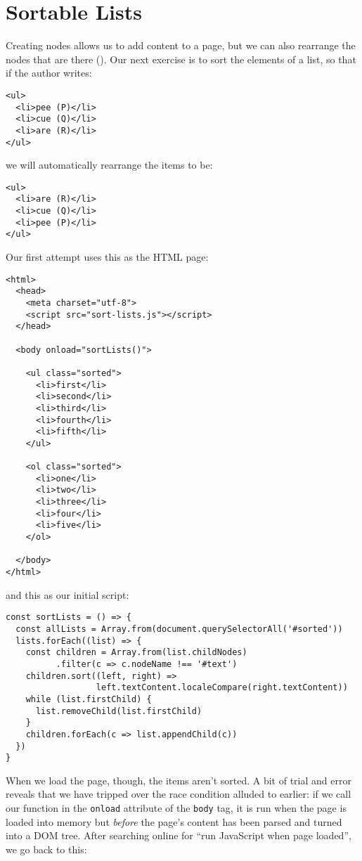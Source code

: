 \section{Sortable Lists}\label{s:pages-sort-list}

Creating nodes allows us to add content to a page,
but we can also rearrange the nodes that are there ().
Our next exercise is to sort the elements of a list,
so that if the author writes:

\begin{verbatim}
<ul>
  <li>pee (P)</li>
  <li>cue (Q)</li>
  <li>are (R)</li>
</ul>
\end{verbatim}

\noindent
we will automatically rearrange the items to be:

\begin{verbatim}
<ul>
  <li>are (R)</li>
  <li>cue (Q)</li>
  <li>pee (P)</li>
</ul>
\end{verbatim}

Our first attempt uses this as the HTML page:

\begin{verbatim}
<html>
  <head>
    <meta charset="utf-8">
    <script src="sort-lists.js"></script>
  </head>

  <body onload="sortLists()">

    <ul class="sorted">
      <li>first</li>
      <li>second</li>
      <li>third</li>
      <li>fourth</li>
      <li>fifth</li>
    </ul>

    <ol class="sorted">
      <li>one</li>
      <li>two</li>
      <li>three</li>
      <li>four</li>
      <li>five</li>
    </ol>

  </body>
</html>
\end{verbatim}

\noindent
and this as our initial script:

\begin{verbatim}
const sortLists = () => {
  const allLists = Array.from(document.querySelectorAll('#sorted'))
  lists.forEach((list) => {
    const children = Array.from(list.childNodes)
          .filter(c => c.nodeName !== '#text')
    children.sort((left, right) =>
                  left.textContent.localeCompare(right.textContent))
    while (list.firstChild) {
      list.removeChild(list.firstChild)
    }
    children.forEach(c => list.appendChild(c))
  })
}
\end{verbatim}

When we load the page,
though,
the items aren't sorted.
A bit of trial and error reveals that we have tripped over the race condition alluded to earlier:
if we call our function in the \texttt{onload} attribute
of the \texttt{body} tag,
it is run when the page is loaded into memory
but \emph{before} the page's content has been parsed and turned into a DOM tree.
After searching online for ``run JavaScript when page loaded'',
we go back to this:

